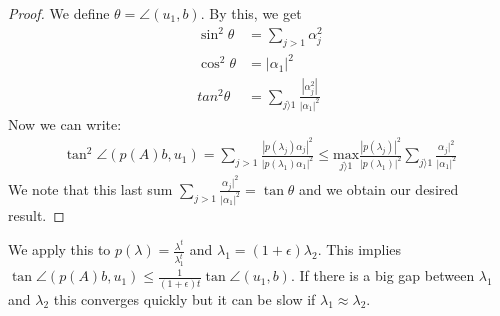 \begin{proof}
We define $\theta = \angle (u_1,b)$. By this, we get
\begin{align*}
    \sin ^2 \theta &=  \sum_{j >1} \alpha_j^2 \\
    \cos ^2 \theta &= |\alpha_1|^2 \\
    tan^2 \theta &= \sum_{j \rangle 1} \frac{|\alpha_j^2|}{|\alpha_1|^2}
\end{align*}
Now we can write:
\begin{align*}
    \tan^2 \angle (p(A)b, u_1) = \sum_{j>1} \frac{|p(\lambda_j)\alpha_j|^2}{|p(\lambda_1)\alpha_1|^2} \leq \underset{j\rangle1}{\text{max}} \frac{|p(\lambda_j)|^2}{|p(\lambda_1)|^2} \sum_{j\rangle1} \frac{\alpha_j |^2}{|\alpha_1| ^2}
\end{align*}
We note that this last sum $ \sum_{j > 1} \frac{\alpha_j |^2}{|\alpha_1| ^2}= \tan \theta$ and we obtain our desired result.
\end{proof}
We apply this to $p(\lambda) = \frac{\lambda^t}{\lambda_1^t}$ and $\lambda_1 = (1+\epsilon) \lambda_2$. This implies $\tan \angle(p(A)b, u_1) \leq \frac{1}{(1+\epsilon)t} \tan \angle(u_1, b)$. If there is a big gap between $\lambda_1$ and $\lambda_2$ this converges quickly but it can be slow if $\lambda_1 \approx \lambda_2$.

